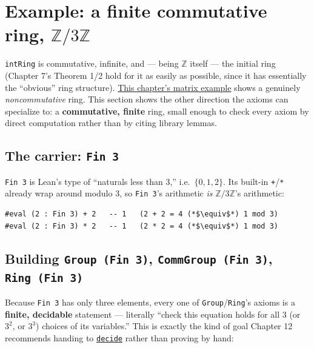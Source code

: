 \section{\texorpdfstring{Example: a finite commutative ring, \(\mathbb{Z}/3\mathbb{Z}\)}{Example: a finite commutative ring, \textbackslash mathbb\{Z\}/3\textbackslash mathbb\{Z\}}}\label{sec:08-rings:05-finite-ring-example:1}

\texttt{intRing} is commutative, infinite, and --- being \(\mathbb{Z}\) itself --- the initial ring (Chapter 7's Theorem 1/2 hold for it as easily as possible, since it has essentially the ``obvious'' ring structure). \hyperref[sec:08-rings:07-matrices:1]{This chapter's matrix example} shows a genuinely \emph{noncommutative} ring. This section shows the other direction the axioms can specialize to: a \textbf{commutative, finite} ring, small enough to check every axiom by direct computation rather than by citing library lemmas.

\subsection{\texorpdfstring{The carrier: \texttt{Fin\ 3}}{The carrier: Fin 3}}\label{sec:08-rings:05-finite-ring-example:2}

\texttt{Fin 3} is Lean's type of ``naturals less than 3,'' i.e.~\(\{0, 1, 2\}\). Its built-in \texttt{+}/\texttt{*} already wrap around modulo 3, so \texttt{Fin 3}'s arithmetic \emph{is} \(\mathbb{Z}/3\mathbb{Z}\)'s arithmetic:

\begin{lstlisting}
#eval (2 : Fin 3) + 2   -- 1   (2 + 2 = 4 (*$\equiv$*) 1 mod 3)
#eval (2 : Fin 3) * 2   -- 1   (2 * 2 = 4 (*$\equiv$*) 1 mod 3)
\end{lstlisting}

\subsection{\texorpdfstring{Building \texttt{Group\ (Fin\ 3)}, \texttt{CommGroup\ (Fin\ 3)}, \texttt{Ring\ (Fin\ 3)}}{Building Group (Fin 3), CommGroup (Fin 3), Ring (Fin 3)}}\label{sec:08-rings:05-finite-ring-example:3}

Because \texttt{Fin 3} has only three elements, every one of \texttt{Group}/\texttt{Ring}'s axioms is a \textbf{finite, decidable} statement --- literally ``check this equation holds for all \(3\) (or \(3^2\), or \(3^3\)) choices of its variables.'' This is exactly the kind of goal Chapter 12 recommends handing to \href{https://lean-lang.org/doc/reference/latest/Tactic-Proofs/Tactic-Reference/}{\texttt{decide}} rather than proving by hand:

